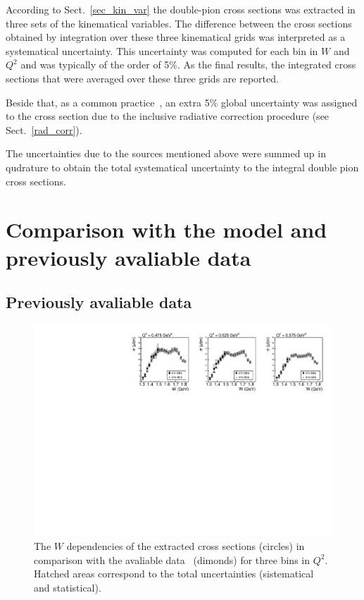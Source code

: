 \documentclass[prc,twocolumn,superscriptaddress,showpacs,amssymb,amsmath,amsfonts,linenumbers,aps]{revtex4-1}
\begin{document}
According to Sect.~\ref{sec_kin_var} the double-pion cross sections was extracted in three sets of the  kinematical variables. The difference between the cross sections obtained by integration over these three kinematical grids was interpreted as a systematical uncertainty. This  uncertainty was computed for each bin in $W$ and $Q^{2}$ and was typically of the order of 5\%.
As the final results, the integrated cross sections that were averaged over these three grids are reported.


Beside that, as a common practice~\cite{Fedotov:2008aa,Isupov:2017lnd},  an extra 5\% global uncertainty was assigned to the cross section due to the inclusive radiative correction procedure (see Sect.~\ref{rad_corr}).


The uncertainties due to the sources mentioned above were summed up in qudrature to obtain the total systematical uncertainty to the integral double pion cross sections.



\section{Comparison with the model and previously avaliable data}

\subsection{Previously avaliable data}

\begin{figure}[htp]
\begin{center}
\includegraphics[width=15cm]{pictures/conclusions/e1e_e1c.pdf}
\caption{\small The $W$ dependencies of the extracted  cross sections (circles) in comparison with the avaliable data~\cite{Fedotov:2008aa} (dimonds) for three bins in $Q^{2}$. Hatched areas correspond to the total uncertainties (sistematical and statistical).}
\label{fig:e1e_e1c}
\end{center}
\end{figure}
\end{document}
